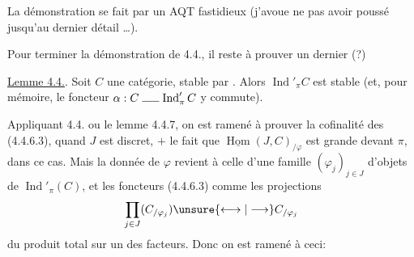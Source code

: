 La démonstration se fait par un AQT fastidieux (j'avoue ne pas avoir poussé jusqu'au dernier détail \ldots).

Pour terminer la démonstration de 4.4., il reste à prouver un dernier (?)

\uline{Lemme 4.4.}. Soit $C$ une  catégorie, stable par  . Alors $\operatorname{Ind}'_{\pi}C$ est stable   (et, pour mémoire, le foncteur $\alpha:C\mathrel{\rule{1.5em}{0.4pt}}\operatorname{Ind}'_{\pi}C$ y commute).

Appliquant   4.4. ou le lemme 4.4.7, on est ramené à prouver la cofinalité des (4.4.6.3), quand $J$ est discret, $+$ le fait que $\underline{\operatorname{Hom}}(J,C)_{/\varphi}$ est grande devant $\pi$, dans ce cas. Mais la donnée de $\varphi$ revient à celle d'une famille $(\varphi_j)_{j\in J}$ d'objets de $\operatorname{Ind}'_{\pi}(C)$, et les foncteurs (4.4.6.3)  comme les projections
\[
\prod_{j\in J}(C_{/\varphi_j})\unsure{\longleftrightarrow|\longrightarrow} C_{/\varphi_j}
\]
du produit total sur un des facteurs. Donc on est ramené à ceci:
